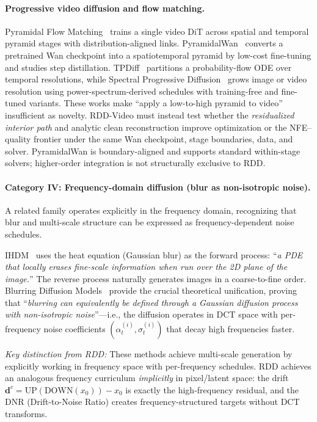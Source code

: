 \documentclass[10pt]{article}
\newcommand{\bd}{\bm{d}}
\begin{document}
\paragraph{Progressive video diffusion and flow matching.}
Pyramidal Flow Matching~\citep{jin2025pyramidflow} trains a single video DiT across spatial and temporal pyramid stages with distribution-aligned links. PyramidalWan~\citep{korzhenkov2026pyramidalwan} converts a pretrained Wan checkpoint into a spatiotemporal pyramid by low-cost fine-tuning and studies step distillation. TPDiff~\citep{ran2026tpdiff} partitions a probability-flow ODE over temporal resolutions, while Spectral Progressive Diffusion~\citep{xiao2026spd} grows image or video resolution using power-spectrum-derived schedules with training-free and fine-tuned variants. These works make ``apply a low-to-high pyramid to video'' insufficient as novelty. RDD-Video must instead test whether the \emph{residualized interior path} and analytic clean reconstruction improve optimization or the NFE--quality frontier under the same Wan checkpoint, stage boundaries, data, and solver. PyramidalWan is boundary-aligned and supports standard within-stage solvers; higher-order integration is not structurally exclusive to RDD.

\paragraph{Category IV: Frequency-domain diffusion (blur as non-isotropic noise).}
A related family operates explicitly in the frequency domain, recognizing that blur and multi-scale structure can be expressed as frequency-dependent noise schedules.

IHDM~\citep{rissanen2023ihdm} uses the heat equation (Gaussian blur) as the forward process: ``\emph{a PDE that locally erases fine-scale information when run over the 2D plane of the image.}''
The reverse process naturally generates images in a coarse-to-fine order.
Blurring Diffusion Models~\citep{hoogeboom2023blurring} provide the crucial theoretical unification, proving that ``\emph{blurring can equivalently be defined through a Gaussian diffusion process with non-isotropic noise}''---i.e., the diffusion operates in DCT space with per-frequency noise coefficients $(\alpha_t^{(i)}, \sigma_t^{(i)})$ that decay high frequencies faster.

\emph{Key distinction from RDD:} These methods achieve multi-scale generation by explicitly working in frequency space with per-frequency schedules. RDD achieves an analogous frequency curriculum \emph{implicitly} in pixel/latent space: the drift $\bd^c = \text{UP}(\text{DOWN}(x_0)) - x_0$ is exactly the high-frequency residual, and the DNR (Drift-to-Noise Ratio) creates frequency-structured targets without DCT transforms.
\end{document}
